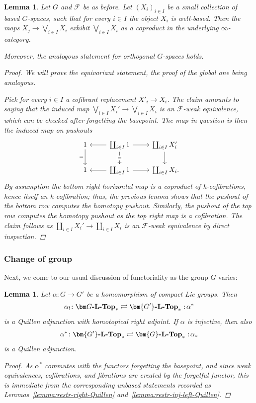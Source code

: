 \documentclass[reqno]{memo-l}
\theoremstyle{mythm}
\newtheorem{lemma}[thm]{Lemma}
\theoremstyle{definition}
\numberwithin{equation}{section}
\newcommand{\Ff}{{\mathcal{F}}}
\newcommand{\cat}[1]{\textbf{\textup{#1}}}
\newcommand\noloc{%
	\nobreak
	\mspace{6mu plus 1mu}
	{:}
	\nonscript\mkern-\thinmuskip
	\mathpunct{}
	\mspace{2mu}
}
\begin{document}
\begin{lemma}\label{lemma:coprod-well-based}
    Let $G$ and $\Ff$ be as before. Let $(X_i)_{i\in I}$ be a small collection of based $G$-spaces, such that for every $i\in I$ the object $X_i$ is well-based. Then the maps $X_j\to\bigvee_{i\in I}X_i$ exhibit $\bigvee_{i\in I}X_i$ as a coproduct in the underlying $\infty$-category. 

    Moreover, the analogous statement for orthogonal $G$-spaces holds.
    \begin{proof}
        We will prove the equivariant statement, the proof of the global one being analogous. 
        
        Pick for every $i\in I$ a cofibrant replacement $X'_i\to X_i$. The claim amounts to saying that the induced map $\bigvee_{i\in I}X_i'\to\bigvee_{i\in I}X_i$ is an $\Ff$-weak equivalence, which can be checked after forgetting the basepoint. The map in question is then the induced map on pushouts
        \[
            \begin{tikzcd}
                1\arrow[d,"="'] & \arrow[l] \coprod_{i\in I}1\arrow[d,"="{description}]\arrow[r] & \coprod_{i\in I} X_i'\arrow[d]\\
                1 &\arrow[l]\coprod_{i\in I} 1\arrow[r]& \coprod_{i\in I} X_i\rlap.
            \end{tikzcd}
        \]       
        By assumption the bottom right horizontal map is a coproduct of h-cofibrations, hence itself an h-cofibration; thus, the previous lemma shows that the pushout of the bottom row computes the homotopy pushout. Similarly, the pushout of the top row computes the homotopy pushout as the top right map is a cofibration. The claim follows as $\coprod_{i\in I}X_i'\to\coprod_{i\in I}X_i$ is an $\Ff$-weak equivalence by direct inspection.
    \end{proof}
\end{lemma}

\subsubsection{Change of group} Next, we come to our usual discussion of functoriality as the group $G$ varies:

\begin{lemma}\label{lemma:res-pted-Quillen}
    Let $\alpha\colon G\to G'$ be a homomorphism of compact Lie groups. Then
    \[
        \alpha_!\colon\cat{$\bm G$-$\cat{L}$-Top}_*\rightleftarrows\cat{$\bm{G'}$-$\cat{L}$-Top}_*\noloc\alpha^*
    \]
    is a Quillen adjunction with homotopical right adjoint. If $\alpha$ is injective, then also
    \[
        \alpha^*\colon\cat{$\bm{G'}$-$\cat{L}$-Top}_*\rightleftarrows\cat{$\bm{G}$-$\cat{L}$-Top}_*\noloc \alpha_*
    \]
    is a Quillen adjunction.
    \begin{proof}
        As $\alpha^*$ commutes with the functors forgetting the basepoint, and since weak equivalences, cofibrations, and fibrations are created by the forgetful functor, this is immediate from the corresponding unbased statements recorded as Lemmas~\ref{lemma:restr-right-Quillen} and~\ref{lemma:restr-inj-left-Quillen}.
    \end{proof}
\end{lemma}
\end{document}
